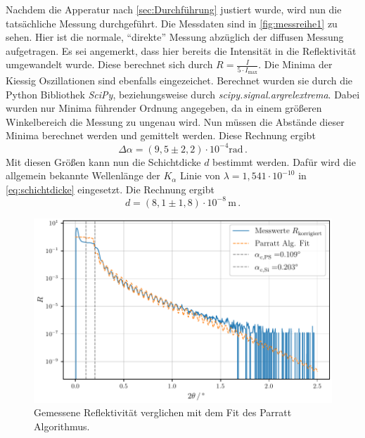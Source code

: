 Nachdem die Apperatur nach \autoref{sec:Durchführung} justiert wurde, wird nun die tatsächliche Messung durchgeführt.
Die Messdaten sind in \autoref{fig:messreihe1} zu sehen.
Hier ist die normale, \enquote{direkte} Messung abzüglich der diffusen Messung aufgetragen.
Es sei angemerkt, dass hier bereits die Intensität in die Reflektivität umgewandelt wurde.
Diese berechnet sich durch $R = \frac{I}{ 5 \cdot I_\text{max}}$.
Die Minima der Kiessig Oszillationen sind ebenfalls eingezeichet.
Berechnet wurden sie durch die Python Bibliothek \textit{SciPy}, beziehungsweise durch \textit{scipy.signal.argrelextrema}.
Dabei wurden nur Minima führender Ordnung angegeben, da in einem größeren Winkelbereich die Messung zu ungenau wird.
Nun müssen die Abstände dieser Minima berechnet werden und gemittelt werden.
Diese Rechnung ergibt
\begin{equation*}
    \Delta \alpha = (9{,}5 \pm 2{,}2) \cdot 10^{-4} \unit\radian \, .
\end{equation*}
Mit diesen Größen kann nun die Schichtdicke $d$ bestimmt werden.
Dafür wird die allgemein bekannte Wellenlänge der $K_\alpha$ Linie von $\lambda = 1{,}541 \cdot 10^{-10}$ in \autoref{eq:schichtdicke} eingesetzt.
Die Rechnung ergibt
\begin{equation*}
    d = (8{,}1 \pm 1{,}8) \cdot 10^{-8} \, \unit\meter \, .
\end{equation*}

\begin{figure}
    \centering
    \includegraphics[width = 0.8 \linewidth]{build/messung2.pdf}
    \caption{Gemessene Reflektivität verglichen mit dem Fit des Parratt Algorithmus.}
    \label{fig:messreihe2}
\end{figure}

